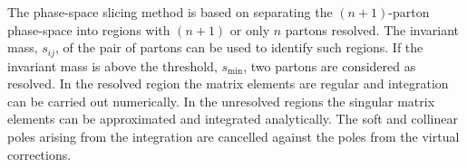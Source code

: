 The phase-space slicing method is based on separating the $(n+1)$-parton phase-space into regions with $(n+1)$ or only $n$ partons resolved. The invariant mass, $s_{ij}$, of the pair of partons can be used to identify such regions. If the invariant mass is above the threshold, $s_\text{min}$, two partons are considered as resolved. In the resolved region the matrix elements are regular and integration can be carried out numerically. In the unresolved regions the singular matrix elements can be approximated and integrated analytically. The soft and collinear poles arising from the integration are cancelled against the poles from the virtual corrections.
